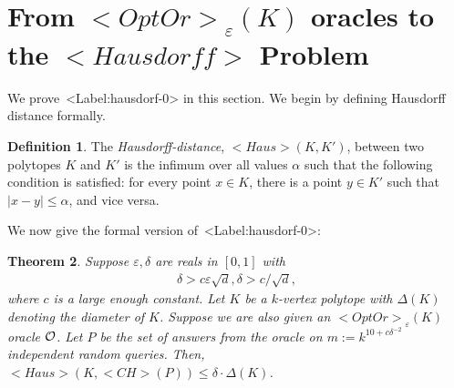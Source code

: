 \documentclass[11pt,letterpaper]{article}
\def\mathsf#1{<#1>}%
\def\xspace{}%
\def\Cref#1{<Label:#1>}%
\newtheorem{theorem}{Theorem}[section]
\theoremstyle{definition}
\newtheorem{defn}[theorem]{Definition}
\theoremstyle{remark}
\newcommand{\CH}{{\mathsf {CH}}}
\newcommand{\Haus}{{\mathsf{Haus}}}
\newcommand{\Hausdorf}{\mathsf {Hausdorff}\xspace }
\newcommand{\opto}{{\mathsf{OptOr}}}
\begin{document}
\section{From $\opto_\varepsilon(K)$ oracles to the $\Hausdorf$ Problem}
\label{sec:haus}
We prove~\Cref{hausdorf-0} in this section. We begin by defining Hausdorff distance formally. 



\begin{defn}
\label{defn:Haus}
    The {\em Hausdorff-distance}, $\Haus(K,K')$, between two polytopes $K$ and $K'$ is the infimum over all values $\alpha$ such that the following condition is satisfied: for every point $x \in K$, there is a point $y \in K'$ such that $|x-y| \leq \alpha$, and vice versa.
\end{defn}

%
We now give the formal version of~\Cref{hausdorf-0}:

\begin{theorem}\label{upper-bound-3}
Suppose $\varepsilon,\delta$ are reals in $[0,1]$ with 
\begin{align}
\label{eq:deltacond}
    \delta > c \varepsilon \sqrt{d}, \delta > c/\sqrt{d}, 
\end{align}
where $c$ is a large enough constant. 
  Let $K$ be a $k$-vertex polytope with $\Delta(K)$ denoting the diameter of $K$. Suppose we are also given an  $ \opto_\varepsilon(K)$ oracle $\cal O$.  
    Let 
  $P$ be the set of answers from the oracle on $m:= k^{10+c \delta^{-2}}$ independent random queries. Then, $\Haus(K, \CH(P)) \leq \delta \cdot \Delta(K)$. 
\end{theorem}
\end{document}
